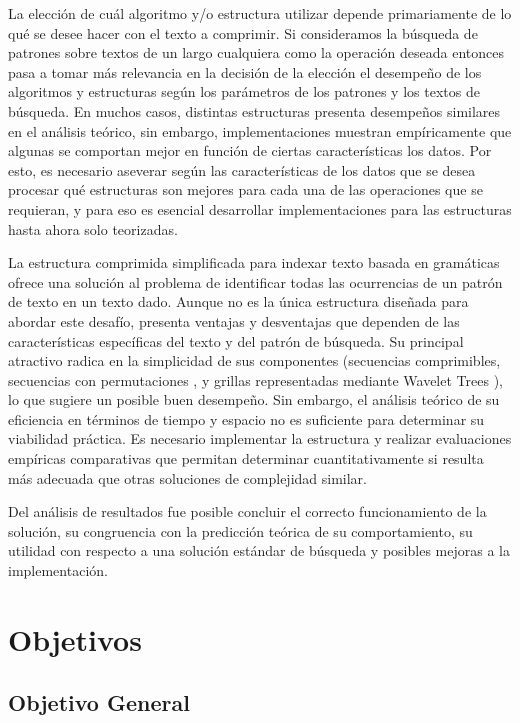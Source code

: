 La elección de cuál algoritmo y/o estructura utilizar depende primariamente de lo qué se desee hacer con el texto a comprimir. Si consideramos la búsqueda de patrones sobre textos de un largo cualquiera como la operación deseada entonces pasa a tomar más relevancia en la decisión de la elección el desempeño de los algoritmos y estructuras según los parámetros de los patrones y los textos de búsqueda. En muchos casos, distintas estructuras presenta desempeños similares en el análisis teórico, sin embargo, implementaciones muestran empíricamente que algunas se comportan mejor en función de ciertas características los datos. Por esto, es necesario aseverar según las características de los datos que se desea procesar qué estructuras son mejores para cada una de las operaciones que se requieran, y para eso es esencial desarrollar implementaciones para las estructuras hasta ahora solo teorizadas.

La estructura comprimida simplificada para indexar texto basada en gramáticas ofrece una solución al problema de identificar todas las ocurrencias de un patrón de texto en un texto dado. Aunque no es la única estructura diseñada para abordar este desafío\cite{claude2020}, presenta ventajas y desventajas que dependen de las características específicas del texto y del patrón de búsqueda. Su principal atractivo radica en la simplicidad de sus componentes (secuencias comprimibles, secuencias con permutaciones \cite[1, Capítulo 6.1]{Navarro}, y grillas representadas mediante Wavelet Trees \cite[1, Capítulo 10.1]{Navarro}), lo que sugiere un posible buen desempeño. Sin embargo, el análisis teórico de su eficiencia en términos de tiempo y espacio no es suficiente para determinar su viabilidad práctica. Es necesario implementar la estructura y realizar evaluaciones empíricas comparativas que permitan determinar cuantitativamente si resulta más adecuada que otras soluciones de complejidad similar.

Del análisis de resultados fue posible concluir el correcto funcionamiento de la solución, su congruencia con la predicción teórica de su comportamiento, su utilidad con respecto a una solución estándar de búsqueda y posibles mejoras a la implementación.

\section{Objetivos}
\subsection*{Objetivo General}\label{sec:obj-g}

